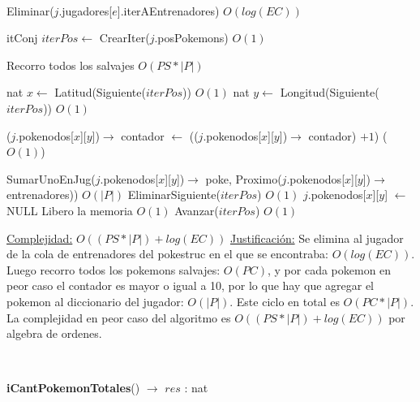 \begin{Algoritmos}
\begin{algorithmic}[1]
$ $\newline
$ $\newline


\State Eliminar($j$.jugadores[$e$].iterAEntrenadores) \Comment $O(log(EC))$

\State itConj $iterPos \gets$ CrearIter($j$.posPokemons) \Comment $O(1)$ 

 Recorro todos los salvajes \Comment $O(PS * |P|)$

	\State nat $x \gets$ Latitud(Siguiente($iterPos$)) \Comment $O(1)$
	\State nat $y \gets$ Longitud(Siguiente($iterPos$)) \Comment $O(1)$		
	
	\State ($j$.pokenodos[$x$][$y$])$\rightarrow$ contador $\gets$ (($j$.pokenodos[$x$][$y$])$\rightarrow$ contador) $+ 1$) \Comment($O(1)$)
	
		\State SumarUnoEnJug($j$.pokenodos[$x$][$y$])$\rightarrow$ poke, Proximo($j$.pokenodos[$x$][$y$])$\rightarrow$ entrenadores)) \Comment $O(|P|)$
		\State EliminarSiguiente($iterPos$) \Comment $O(1)$
		\State $j$.pokenodos[$x$][$y$] $\gets$ NULL \Comment Libero la memoria $O(1)$
	\Else 
		\State Avanzar($iterPos$)	\Comment $O(1)$	
	\EndIf

\EndWhile 



\medskip
\Statex \underline{Complejidad:} $O((PS *|P|) + log(EC))$ 
\Statex \underline{Justificaci\'on:} Se elimina al jugador de la cola de entrenadores del pokestruc en el que se encontraba: $O(log(EC))$. Luego recorro todos los pokemons salvajes: $O(PC)$, y por cada pokemon en peor caso el contador es mayor o igual a 10, por lo que hay que agregar el pokemon al diccionario del jugador: $O(|P|)$. Este ciclo en total es $O(PC*|P|)$. La complejidad en peor caso del algoritmo es $O((PS *|P|) + log(EC))$ por algebra de ordenes.
\end{algorithmic}

$ $\newline
$ $\newline




\begin{algorithm}[H]
{\textbf{iCantPokemonTotales}() $\to$ $res$ : nat}
\begin{algorithmic}[1]


\end{algorithmic}
\end{algorithm}
\end{Algoritmos}
